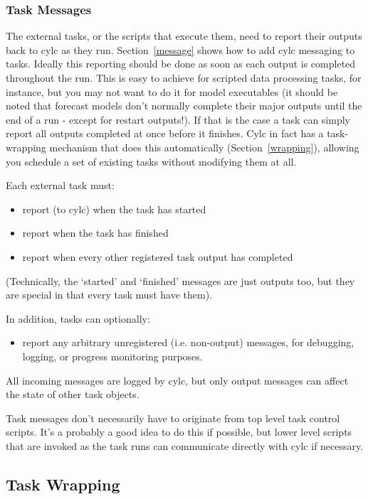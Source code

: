 \documentclass[11pt,a4paper]{article}
\begin{document}
\subsubsection{Task Messages}

The external tasks, or the scripts that execute them, need to report
their outputs back to cylc as they run. Section~\ref{message} shows
how to add cylc messaging to tasks.  Ideally this reporting should be
done as soon as each output is completed throughout the run. This is
easy to achieve for scripted data processing tasks, for instance, but
you may not want to do it for model executables (it should be noted that
forecast models don't normally complete their major outputs until the
end of a run - except for restart outputs!). If that is the case a task
can simply report all outputs completed at once before it finishes.
Cylc in fact has a task-wrapping mechanism that does this automatically
(Section~\ref{wrapping}), allowing you schedule a set of existing
tasks without modifying them at all.  

Each external task must:

\begin{itemize}
\item report (to cylc) when the task has started
\item report when the task has finished
\item report when every other registered task output has
completed
\end{itemize}

(Technically, the `started' and `finished' messages are just
outputs too, but they are special in that every task
must have them).

In addition, tasks can optionally:

\begin{itemize}
\item report any arbitrary unregistered (i.e. non-output)
messages, for debugging, logging, or progress monitoring purposes.
\end{itemize}

All incoming messages are logged by cylc, but only output messages can
affect the state of other task objects.

Task messages don't necessarily have to originate from top level task
control scripts. It's a probably a good idea to do this if possible, but
lower level scripts that are invoked as the task runs can communicate
directly with cylc if necessary.

\subsection{Task Wrapping}
\label{TaskWrapping}
\end{document}
